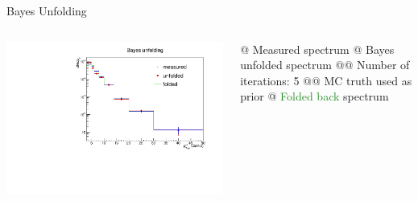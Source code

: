 \documentclass[xcolor={usenames,dvipsnames}, aspectratio=169]{beamer}
\begin{document}
\begin{frame}[fragile]{Bayes Unfolding}
\begin{columns}
\centering
\includegraphics[width=\textwidth]{img/pPb/PythiaRM_Djet5Excl_bayes5_weight_3_50_3_50_UnfSpectrum.pdf}
\begin{easylist}[itemize]
@ \textcolor{NavyBlue}{Measured spectrum}
@ \textcolor{BrickRed}{Bayes unfolded} spectrum
@@ Number of iterations: 5
@@ MC truth used as prior
@ \textcolor{ForestGreen}{Folded back} spectrum
\end{easylist}
\end{columns}
\end{frame}
\end{document}
